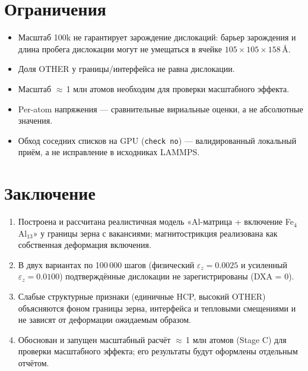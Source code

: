 \documentclass[14pt,a4paper]{extarticle}
\newcommand{\code}[1]{\texttt{#1}}
\begin{document}
\section{Ограничения}
\begin{itemize}[leftmargin=1.6em,itemsep=1pt]
\item Масштаб 100k не гарантирует зарождение дислокаций: барьер зарождения и длина пробега дислокации могут не умещаться в ячейке $105\times105\times158$\,\AA.
\item Доля OTHER у границы/интерфейса не равна дислокации.
\item Масштаб $\approx$\,1 млн атомов необходим для проверки масштабного эффекта.
\item Per-atom напряжения — сравнительные вириальные оценки, а не абсолютные значения.
\item Обход соседних списков на GPU (\code{check no}) — валидированный локальный приём, а не исправление в исходниках LAMMPS.
\end{itemize}

\section{Заключение}
\begin{enumerate}[leftmargin=1.8em,itemsep=1pt]
\item Построена и рассчитана реалистичная модель «Al-матрица + включение Fe$_4$Al$_{13}$» у границы зерна с вакансиями; магнитострикция реализована как собственная деформация включения.
\item В двух вариантах по 100\,000 шагов (физический $\varepsilon_z = 0.0025$ и усиленный $\varepsilon_z = 0.0100$) подтверждённые дислокации не зарегистрированы (DXA = 0).
\item Слабые структурные признаки (единичные HCP, высокий OTHER) объясняются фоном границы зерна, интерфейса и тепловыми смещениями и не зависят от деформации ожидаемым образом.
\item Обоснован и запущен масштабный расчёт $\approx$\,1 млн атомов (Stage C) для проверки масштабного эффекта; его результаты будут оформлены отдельным отчётом.
\end{enumerate}

\end{document}
